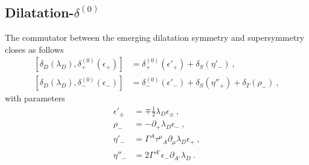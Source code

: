 \documentclass[a4paper,10pt,openany]{article}
\begin{document}
	\subsection[Dilatation-$\delta^{(0)}$]{Dilatation-\boldmath $\delta^{(0)}$}
	The commutator between the emerging dilatation symmetry and supersymmetry closes as follows
	\begin{subequations}
		\begin{align}
			[\delta_{D}(\lambda_{D}),\delta^{(0)}_{+}(\epsilon_{+})]&=\delta^{(0)}_{+}(\epsilon'_{+})+\delta_{S}(\eta'_{-})\ , \\
			[\delta_{D}(\lambda_{D}),\delta^{(0)}_{-}(\epsilon_{-})]&=\delta^{(0)}_{-}(\epsilon'_{-})+\delta_{S}(\eta''_{+})+\delta_{T}(\rho_{-})\ ,
		\end{align}
	\end{subequations}
	with parameters
	\begin{subequations}
		\begin{align}
			\epsilon'_{\pm}&=\mp\frac{1}{2}\lambda_{D} \epsilon_{\pm}\ , \\
			\rho_{-}&=-\partial_{+}\lambda_{D}\epsilon_{-}\ , \\
			\eta'_{-}&=\Gamma^{A}\tau^{\mu}{}_{A}\partial_{\mu}\lambda_{D} \epsilon_{+}\ , \\
			\eta''_{-}&=2\Gamma^{A'}\epsilon_{-}\partial_{A'}\lambda_{D}\ .
		\end{align}
	\end{subequations}
	
	
	
	
\end{document}
